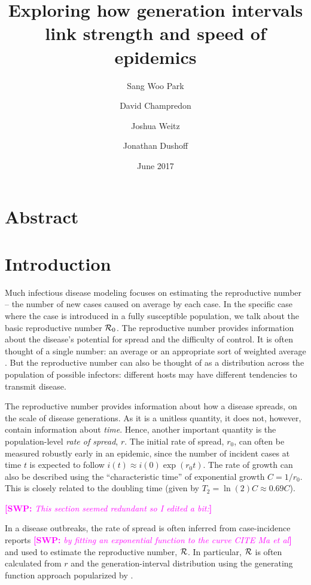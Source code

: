 \documentclass[12pt,]{article}
\title{Exploring how generation intervals link strength and speed of epidemics}
\author{Sang Woo Park \and David Champredon \and Joshua Weitz \and Jonathan Dushoff}
\date{June 2017}
\newcommand{\RR}{\ensuremath{{\cal R}}}
\newcommand{\Rx}[1]{\ensuremath{{\cal R}_{#1}}}
\newcommand{\Ro}{\Rx{0}}
\newcommand{\Tc}{\ensuremath{C}}
\newcommand{\comment}[3]{\textcolor{#1}{\textbf{[#2: }\textit{#3}\textbf{]}}}
\newcommand{\swp}[1]{\comment{magenta}{SWP}{#1}}
\begin{document}
\maketitle

\section*{Abstract}

\section{Introduction}

Much infectious disease modeling focuses on estimating the reproductive number -- the number of new cases caused on average by each case.
In the specific case where the case is introduced in a fully susceptible population, we talk about the basic reproductive number \Ro.
The reproductive number provides information about the disease's potential for spread and the difficulty of control.
It is often thought of a single number: an average \cite{AndeMay91} or an appropriate sort of weighted average \cite{DiekHees90}.
But the reproductive number can also be thought of as a distribution across the population of possible infectors: different hosts may have different tendencies to transmit disease.

The reproductive number provides information about how a disease spreads, on the scale of disease generations.
As it is a unitless quantity, it does not, however, contain information about \emph{time}.
Hence, another important quantity is the population-level \emph{rate of spread}, $r$. The initial rate of spread, $r_0$, can often be measured robustly early in an epidemic, since the number of incident cases at time $t$ is expected to follow $i(t) \approx i(0) \exp(r_0t)$. The rate of growth can also be described using the ``characteristic time'' of exponential growth $\Tc = 1/r_0$. This is closely related to the doubling time (given by $T_2 = \ln(2) \Tc \approx 0.69 \Tc$).

\swp{This section seemed redundant so I edited a bit:}

In a disease outbreaks, the rate of spread is often inferred from case-incidence reports \swp{by fitting an exponential function to the curve CITE Ma et al} and used to estimate the reproductive number, \RR.
In particular, $\RR$ is often calculated from $r$ and the generation-interval distribution using the generating function approach popularized by \cite{WallLips07}.
\end{document}
